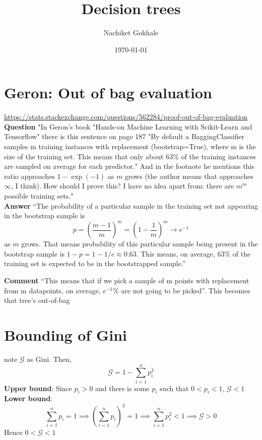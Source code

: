 \documentclass{article}
\newcommand{\beq}{\begin{equation}}
\newcommand{\eeq}{\end{equation}}
\begin{document}
\title{Decision trees}
\author{Nachiket Gokhale}
\date{\today}
\maketitle
\section{Geron: Out of bag evaluation}
\url{https://stats.stackexchange.com/questions/562284/proof-out-of-bag-evaluation}
\textbf{Question} "In Geron's book "Hands-on Machine Learning with Scikit-Learn and Tensorflow" there is this sentence on page 187 "By default a BaggingClassifier samples m training instances with replacement (bootstrap=True), where m is the size of the training set. This means that only about 63\% of the training instances are sampled on average for each predictor."  And in the footnote he mentions this ratio approaches $1-\exp(-1)$ as $m$ grows (the author means that approaches $\infty$, I think). How should I prove this? I have no idea apart from: there are $m^m$ possible training sets."\\
\textbf{Answer} ``The probability of a particular sample in the training set not appearing in the bootstrap sample is 
$$p=\left(\frac{m-1}{m}\right)^m=\left(1-\frac{1}{m}\right)^m\rightarrow e^{-1}$$ as $m$ grows. That means probability of this particular sample being present in the bootstrap sample is $1-p=1-1/e\approx 0.63$. This means, on average, $63\%$ of the training set is expected to be in the bootstrapped sample.''

\textbf{Comment} ``This means that if we pick a sample of m points with replacement from m datapoints, on average, $e^{-1}$\% are not going to be picked''. This becomes that tree's out-of-bag
%
%
%
\section{Bounding of Gini}
note $\mathcal{G}$ as Gini. Then,
\beq
\mathcal{G} = 1 - \sum_{i=1}^{n}p_i^2
\eeq
\textbf{Upper bound}: Since $p_i>0$ and there is some $p_i$ such that $0<p_i<1$, $\mathcal{G} < 1$\\
\textbf{Lower bound}:
\beq
\sum_{i=1}^{n}p_i = 1 \implies (\sum_{i=1}^{n}p_i)^2 = 1 \implies \sum_{i=1}^{n}p_i^2 < 1 \implies \mathcal{G} > 0
\eeq
Hence $0<\mathcal{G}<1$
\end{document}
